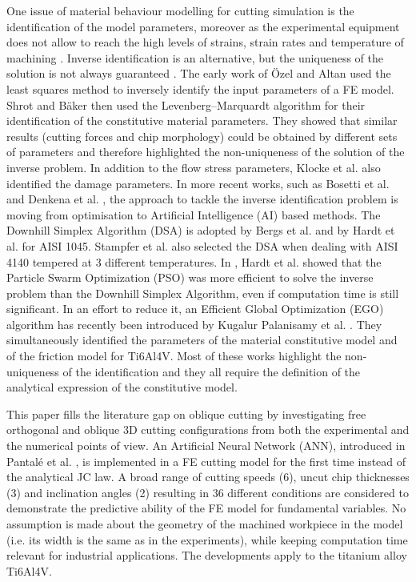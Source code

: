 \documentclass[preprint,12pt,times]{elsarticle}
\begin{document}
One issue of material behaviour modelling for cutting simulation is the identification of the model parameters, moreover as the experimental equipment does not allow to reach the high levels of strains, strain rates and temperature of machining \cite{melkote_Advances_2017}. Inverse identification is an alternative, but the uniqueness of the solution is not always guaranteed \cite{arrazola_Recent_2013, melkote_Advances_2017}. The early work of Özel and Altan \cite{ozel_Determination_2000} used  the least squares method to inversely identify the input parameters of a FE model. Shrot and Bäker \cite{shrot_Determination_2012} then used the Levenberg–Marquardt algorithm for their identification of the constitutive material parameters. They showed that similar results (cutting forces and chip morphology) could be obtained by different sets of parameters and therefore highlighted the non-uniqueness of the solution of the inverse problem. In addition to the flow stress parameters, Klocke et al. \cite{klocke_Orthogonal_2013} also identified the damage parameters. In more recent works, such as Bosetti et al. \cite{bosetti_Identification_2013} and Denkena et al. \cite{denkena_Inverse_2015}, the approach to tackle the inverse identification problem is moving from optimisation to Artificial Intelligence (AI) based methods. The Downhill Simplex Algorithm (DSA) is adopted by Bergs et al. \cite{bergs_Determination_2020} and by Hardt et al. \cite{hardt_Investigations_2021} for AISI 1045. Stampfer et al. \cite{stampfer_Material_2021} also selected the DSA when dealing with AISI 4140 tempered at 3 different temperatures. In \cite{hardt_Application_2021}, Hardt et al. showed that the Particle Swarm Optimization (PSO) was more efficient to solve the inverse problem than the Downhill Simplex Algorithm, even if computation time is still significant. In an effort to reduce it, an Efficient Global Optimization (EGO) algorithm has recently been introduced by Kugalur Palanisamy et al. \cite{kugalurpalanisamy_Identification_2022}. They simultaneously identified the parameters of the material constitutive model and of the friction model for Ti6Al4V. Most of these works highlight the non-uniqueness of the identification and they all require the definition of the analytical expression of the constitutive model.

This paper fills the literature gap on oblique cutting by investigating free orthogonal and oblique 3D cutting configurations from both the experimental and the numerical points of view. An Artificial Neural Network (ANN), introduced in Pantalé et al. \cite{pantale_Efficient_2022}, is implemented in a FE cutting model for the first time instead of the analytical JC law. A broad range of cutting speeds (6), uncut chip thicknesses (3) and inclination angles (2) resulting in 36 different conditions are considered to demonstrate the predictive ability of the FE model for fundamental variables. No assumption is made about the geometry of the machined workpiece in the model (i.e. its width is the same as in the experiments), while keeping computation time relevant for industrial applications. The developments apply to the titanium alloy Ti6Al4V.
\end{document}

